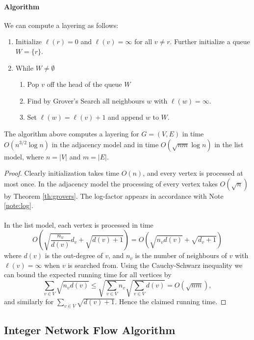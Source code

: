 \paragraph{Algorithm}
We can compute a layering as follows:
\begin{enumerate}
\item Initialize $\ell(r) = 0$ and $\ell(v) = \infty$ for all $v \neq r$. Further initialize a queue $W = \{r\}$.
\item While $W\neq \emptyset$
	\begin{enumerate}
	\item Pop $v$ off the head of the queue $W$
	\item Find by Grover's Search all neighbours $w$ with $\ell(w) = \infty$.
	\item Set $\ell(w) = \ell(v) + 1$ and append $w$ to $W$.
	\end{enumerate} 
\end{enumerate}
\begin{theorem}\label{th:layering}
The algorithm above computes a layering for $G=(V,E)$  in time $O(n^{3/2}\log n)$ in the adjacency model and in time $O(\sqrt{nm}\log n)$ in the list model, where $n = |V|$ and $m = |E|$.
\end{theorem}
\begin{proof}
Clearly initialization takes time $O(n)$, and every vertex is processed at most once. In the adjacency model the processing of every vertex takes $O(\sqrt{n})$ by Theorem \ref{th:grovers}. The log-factor appears in accordance with Note \ref{note:log}.
\paragraph{}
In the list model, each vertex is processed in time $$O(\sqrt{\frac{n_v}{d(v)}}d_v + \sqrt{d(v) + 1}) = O(\sqrt{n_vd(v)} + \sqrt{d_v + 1})$$ where $d(v)$ is the out-degree of $v$, and $n_v$ is the number of neighbours of $v$ with $\ell(v)=\infty$ when $v$ is searched from. Using the Cauchy-Schwarz inequality we can bound the expected running time for all vertices by
$$\sum_{v\in V} \sqrt{n_vd(v)} \leq \sqrt{\sum_{v\in V} n_v}\sqrt{\sum_{v \in V} d(v)} = O(\sqrt{nm}),$$
and similarly for $\sum_{v \in V} \sqrt{d(v) + 1}$. Hence the claimed running time.
\end{proof}
\subsection{Integer Network Flow Algorithm}
